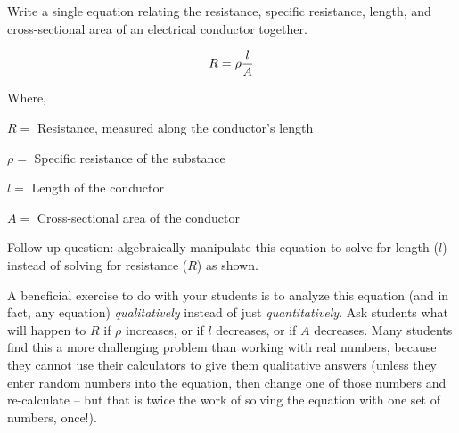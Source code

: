 

Write a single equation relating the resistance, specific resistance, length, and cross-sectional area of an electrical conductor together.







$$R = \rho {l \over A}$$

\noindent
Where,

$R =$ Resistance, measured along the conductor's length

$\rho =$ Specific resistance of the substance

$l =$ Length of the conductor

$A =$ Cross-sectional area of the conductor

\vskip 10pt

Follow-up question: algebraically manipulate this equation to solve for length ($l$) instead of solving for resistance ($R$) as shown.







A beneficial exercise to do with your students is to analyze this equation (and in fact, any equation) {\it qualitatively} instead of just {\it quantitatively}.  Ask students what will happen to $R$ if $\rho$ increases, or if $l$ decreases, or if $A$ decreases.  Many students find this a more challenging problem than working with real numbers, because they cannot use their calculators to give them qualitative answers (unless they enter random numbers into the equation, then change one of those numbers and re-calculate -- but that is twice the work of solving the equation with one set of numbers, once!).





